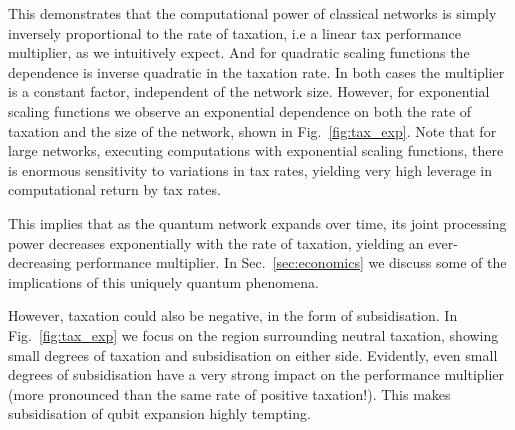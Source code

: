 This demonstrates that the computational power of classical networks is simply inversely proportional to the rate of taxation, i.e a linear tax performance multiplier, as we intuitively expect. And for quadratic scaling functions the dependence is inverse quadratic in the taxation rate. In both cases the multiplier is a constant factor, independent of the network size. However, for exponential scaling functions we observe an exponential dependence on both the rate of taxation and the size of the network, shown in Fig.~\ref{fig:tax_exp}. Note that for large networks, executing computations with exponential scaling functions, there is enormous sensitivity to variations in tax rates, yielding very high leverage in computational return by tax rates.

This implies that as the quantum network expands over time, its joint processing power decreases exponentially with the rate of taxation, yielding an ever-decreasing performance multiplier. In Sec.~\ref{sec:economics} we discuss some of the implications of this uniquely quantum phenomena.

However, taxation could also be negative, in the form of subsidisation. In Fig.~\ref{fig:tax_exp} we focus on the region surrounding neutral taxation, showing small degrees of taxation and subsidisation on either side. Evidently, even small degrees of subsidisation have a very strong impact on the performance multiplier (more pronounced than the same rate of positive taxation!). This makes subsidisation of qubit expansion highly tempting.

